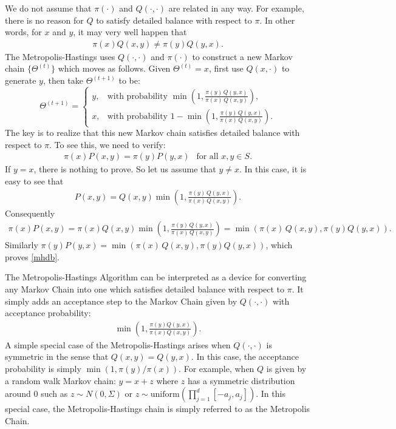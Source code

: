 \documentclass{scrartcl}
\begin{document}
  We do not assume that $\pi(\cdot)$ and $Q(\cdot, \cdot)$ are related
  in any way. For example, there is no reason for $Q$ to satisfy
  detailed balance with respect to $\pi$. In other words, for $x$ and
  $y$, it may very well happen that
  \begin{align*}
    \pi(x) Q(x, y) \neq \pi(y) Q(y, x). 
  \end{align*}
  The Metropolis-Hastings uses $Q(\cdot, \cdot)$ and $\pi(\cdot)$ to
  construct a new Markov chain $\{\Theta^{(t)}\}$ which moves as
  follows. Given $\Theta^{(t)} = x$, first use $Q(x, \cdot)$ to
  generate $y$, then take $\Theta^{(t+1)}$ to be:
  \[
\Theta^{(t+1)} =
\begin{cases}
y, & \text{with probability } \min\!\left(1, \frac{\pi(y)\,Q(y,x)}{\pi(x)\,Q(x,y)}\right), \\[1em]
x, & \text{with probability } 1 - \min\!\left(1, \frac{\pi(y)\,Q(y,x)}{\pi(x)\,Q(x,y)}\right).
\end{cases}
\]
The key is to realize that this new Markov chain satisfies detailed
balance with respect to $\pi$. To see this, we need to verify:
\begin{align}\label{mhdb}
  \pi(x) P(x, y) = \pi(y) P(y, x) ~~\text{ for all $x, y \in S$}. 
\end{align}
If $y = x$, there is nothing to prove. So let us assume that $y \neq
x$. In this case, it is easy to see that
\begin{align*}
  P(x, y) = Q(x, y) \min\!\left(1,
  \frac{\pi(y)\,Q(y,x)}{\pi(x)\,Q(x,y)}\right). 
\end{align*}
Consequently
\begin{align*}
  \pi(x) P(x, y) = \pi(x) Q(x, y) \min\!\left(1,
  \frac{\pi(y)\,Q(y,x)}{\pi(x)\,Q(x,y)}\right) =
  \min\!\left(\pi(x)\,Q(x,y), \pi(y) Q(y, x)\right). 
\end{align*}
Similarly $\pi(y) P(y, x) =   \min\!\left(\pi(x)\,Q(x,y), \pi(y) Q(y,
  x)\right)$, which proves \eqref{mhdb}.

The Metropolis-Hastings Algorithm can be interpreted as a device for
converting any Markov Chain into one which satisfies detailed balance
with respect to $\pi$. It simply adds an acceptance step to the
Markov Chain given by $Q(\cdot, \cdot)$ with acceptance probability:
\begin{align*}
  \min \left(1, \frac{\pi(y) Q(y, x)}{\pi(x) Q(x, y)} \right). 
\end{align*}
A simple special case of the Metropolis-Hastings arises when $Q(\cdot,
\cdot)$ is symmetric in the sense that $Q(x, y) = Q(y, x)$. In this
case, the acceptance probability is simply $\min(1,
\pi(y)/\pi(x))$. For example, when $Q$ is given by a random walk
Markov chain: $y = x + z$ where $z$ has a symmetric distribution
around 0 such as $z \sim N(0, \Sigma)$ or $z \sim
\text{uniform}(\prod_{j=1}^d [-a_j, a_j])$. In this special case, the
Metropolis-Hastings chain is simply referred to as the Metropolis
Chain.
\end{document}
